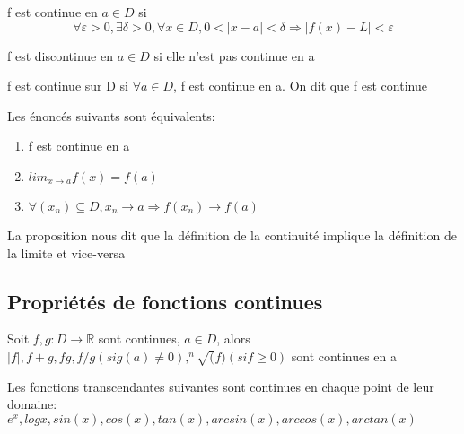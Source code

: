 \documentclass{article}
\begin{document}
\begin{definition}
    f est continue en $a \in D$ si
    $$ \forall \varepsilon > 0 , \exists \delta > 0, \forall x \in D,
    0 < |x-a|< \delta \Longrightarrow |f(x) -L| < \varepsilon$$
\end{definition}

\begin{definition}
    f est discontinue en $a \in D$ si elle n'est pas continue en a
\end{definition}

\begin{definition}
    f est continue sur D si $\forall a \in D$, f est continue en a.
    On dit que f est continue
\end{definition}

\begin{proposition}
    Les énoncés suivants sont équivalents:
    \begin{enumerate}
	\item f est continue en a
	\item $ lim_{x \to a} f(x) = f(a)$
	\item $\forall (x_n) \subseteq D, x_n \to a \Longrightarrow
	    f(x_n) \to f(a)$
    \end{enumerate}
\end{proposition}

\begin{intuition}
    La proposition nous dit que la définition de la continuité implique
    la définition de la limite et vice-versa
\end{intuition}

\subsection{Propriétés de fonctions continues}

\begin{proposition}
    Soit $f,g:D \to \mathbb{R}$ sont continues, $a \in D$, alors $|f|,
    f+g, fg, f/g (si g(a) \neq 0), ^n\sqrt(f) (si f \geq 0)$ sont
    continues en a
\end{proposition}

\begin{proposition}
    Les fonctions transcendantes suivantes sont continues en chaque point
    de leur domaine: $e^x, log x, sin(x), cos(x), tan(x), arcsin(x),
    arccos(x), arctan(x)$
\end{proposition}
\end{document}
